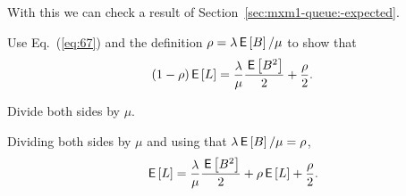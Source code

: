 With this we can check a result of Section~\ref{sec:mxm1-queue:-expected}.  
\begin{exercise}[\faCalculator]
  Use Eq.~(\ref{eq:67}) and the definition  $\rho=\lambda \,\mathsf{E}\left[B\right]/\mu$ to show that
\begin{equation*}
(1- \rho) \,\mathsf{E}\left[L\right] = \frac{\lambda}\mu \frac{\,\mathsf{E}\left[B^2\right]}2 + \frac\rho2.
\end{equation*}
\begin{hint}
Divide both sides by $\mu$.
\end{hint}
\begin{solution}
Dividing both sides by $\mu$ and using that $\lambda \,\mathsf{E}\left[B\right]/\mu = \rho$, 
\begin{equation*}
  \,\mathsf{E}\left[L\right] = \frac{\lambda}{\mu}  \frac{\,\mathsf{E}\left[B^2\right]}2 + \rho \,\mathsf{E}\left[L\right] + \frac\rho2.
\end{equation*}
\end{solution}
\end{exercise}



